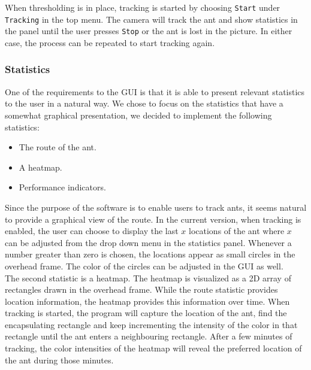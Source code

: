 When thresholding is in place, tracking is started by choosing \texttt{Start} under \texttt{Tracking} in the top menu. The camera will track the ant and show statistics in the panel until the user presses \texttt{Stop} or the ant is lost in the picture. In either case, the process can be repeated to start tracking again.



\subsubsection{Statistics} \mbox{}\par
One of the requirements to the GUI is that it is able to present relevant statistics to the user in a natural way. We chose to focus on the statistics that have a somewhat graphical presentation, we decided to implement the following statistics:

\begin{itemize}
  \item{The route of the ant.}
  \item{A heatmap.}
  \item{Performance indicators.}
\end{itemize}

Since the purpose of the software is to enable users to track ants, it seems natural to provide a graphical view of the route. In the current version, when tracking is enabled, the user can choose to display the last $x$ locations of the ant where $x$ can be adjusted from the drop down menu in the statistics panel. Whenever a number greater than zero is chosen, the locations appear as small circles in the overhead frame.
The color of the circles can be adjusted in the GUI as well. \\	

The second statistic is a heatmap. The heatmap is visualized as a 2D array of rectangles drawn in the overhead frame. While the route statistic provides location information, the heatmap provides this information over time. When tracking is started, the program will capture the location of the ant, find the encapsulating rectangle and keep incrementing the intensity of the color in that rectangle until the ant enters a neighbouring rectangle. After a few minutes of tracking, the color intensities of the heatmap will reveal the preferred location of the ant during those minutes. \\

